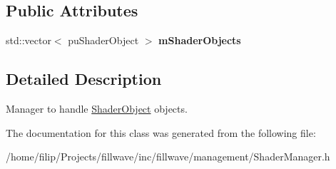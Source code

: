 \subsection*{Public Attributes}
\begin{DoxyCompactItemize}
\item 
\hypertarget{classfillwave_1_1manager_1_1ShaderManager_a984869341fe97168b686ab4acdff30e0}{}std\+::vector$<$ pu\+Shader\+Object $>$ {\bfseries m\+Shader\+Objects}\label{classfillwave_1_1manager_1_1ShaderManager_a984869341fe97168b686ab4acdff30e0}

\end{DoxyCompactItemize}


\subsection{Detailed Description}
Manager to handle \hyperlink{structfillwave_1_1manager_1_1ShaderObject}{Shader\+Object} objects. 

The documentation for this class was generated from the following file\+:\begin{DoxyCompactItemize}
\item 
/home/filip/\+Projects/fillwave/inc/fillwave/management/Shader\+Manager.\+h\end{DoxyCompactItemize}

